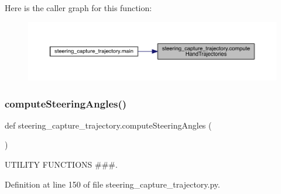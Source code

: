 Here is the caller graph for this function\+:\nopagebreak
\begin{figure}[H]
\begin{center}
\leavevmode
\includegraphics[width=350pt]{namespacesteering__capture__trajectory_a5c680d4059a6f6632b82e3f8faf773b7_icgraph}
\end{center}
\end{figure}
\mbox{\label{namespacesteering__capture__trajectory_a4b5f9adad77bffee303df87fa109e3ce}} 
\subsubsection{\texorpdfstring{computeSteeringAngles()}{computeSteeringAngles()}}
{\footnotesize\ttfamily def steering\+\_\+capture\+\_\+trajectory.\+compute\+Steering\+Angles (\begin{DoxyParamCaption}{ }\end{DoxyParamCaption})}



U\+T\+I\+L\+I\+TY F\+U\+N\+C\+T\+I\+O\+NS \#\#\#. 



Definition at line 150 of file steering\+\_\+capture\+\_\+trajectory.\+py.


